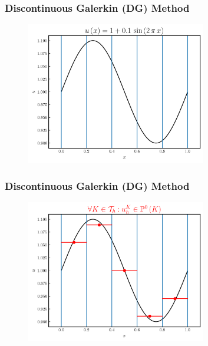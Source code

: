 \documentclass{beamer}
\begin{document}
\begin{frame}
\frametitle{Discontinuous Galerkin (DG) Method}

  \begin{figure}[htb!]
    \centering
    \includegraphics[width=0.7\textwidth]{fig.sine.png}
  \end{figure}

\end{frame}

\begin{frame}
\frametitle{Discontinuous Galerkin (DG) Method}

  \begin{figure}[htb!]
    \centering
    \includegraphics[width=0.7\textwidth]{fig.sine_k0.png}
  \end{figure}

\end{frame}
\end{document}

